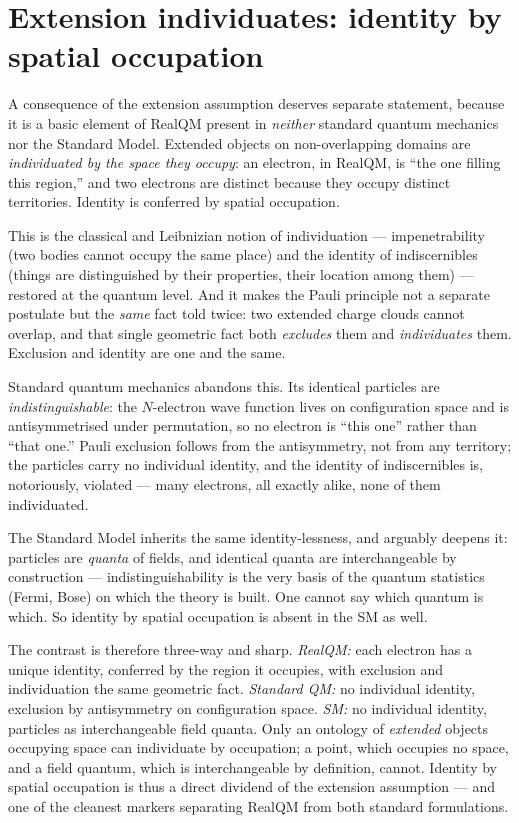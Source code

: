 \documentclass[11pt]{article}
\begin{document}
\section{Extension individuates: identity by spatial occupation}
\label{sec:identity}

A consequence of the extension assumption deserves separate statement, because it is a basic element of
RealQM present in \emph{neither} standard quantum mechanics nor the Standard Model. Extended objects on
non-overlapping domains are \emph{individuated by the space they occupy}: an electron, in RealQM, is
``the one filling this region,'' and two electrons are distinct because they occupy distinct territories.
Identity is conferred by spatial occupation.

This is the classical and Leibnizian notion of individuation --- impenetrability (two bodies cannot
occupy the same place) and the identity of indiscernibles (things are distinguished by their properties,
their location among them) --- restored at the quantum level. And it makes the Pauli principle not a
separate postulate but the \emph{same} fact told twice: two extended charge clouds cannot overlap, and
that single geometric fact both \emph{excludes} them and \emph{individuates} them. Exclusion and identity
are one and the same.

Standard quantum mechanics abandons this. Its identical particles are \emph{indistinguishable}: the
$N$-electron wave function lives on configuration space and is antisymmetrised under permutation, so no
electron is ``this one'' rather than ``that one.'' Pauli exclusion follows from the antisymmetry, not from
any territory; the particles carry no individual identity, and the identity of indiscernibles is,
notoriously, violated --- many electrons, all exactly alike, none of them individuated.

The Standard Model inherits the same identity-lessness, and arguably deepens it: particles are
\emph{quanta} of fields, and identical quanta are interchangeable by construction --- indistinguishability
is the very basis of the quantum statistics (Fermi, Bose) on which the theory is built. One cannot say
which quantum is which. So identity by spatial occupation is absent in the SM as well.

The contrast is therefore three-way and sharp. \emph{RealQM:} each electron has a unique identity,
conferred by the region it occupies, with exclusion and individuation the same geometric fact.
\emph{Standard QM:} no individual identity, exclusion by antisymmetry on configuration space. \emph{SM:}
no individual identity, particles as interchangeable field quanta. Only an ontology of \emph{extended}
objects occupying space can individuate by occupation; a point, which occupies no space, and a field
quantum, which is interchangeable by definition, cannot. Identity by spatial occupation is thus a direct
dividend of the extension assumption --- and one of the cleanest markers separating RealQM from both
standard formulations.
\end{document}

